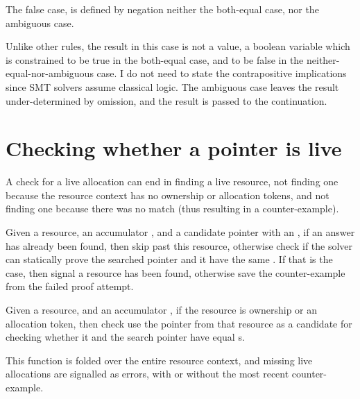 The false case, is defined by negation \textemdash{} neither the both-equal
case, nor the ambiguous case.


Unlike other rules, the result in this case is not a value, a boolean variable
which is constrained to be true in the both-equal case, and to be false in the
neither-equal-nor-ambiguous case. I do not need to state the contrapositive
implications since SMT solvers assume classical logic. The ambiguous case
leaves the result under-determined by omission, and the result is passed to the
continuation.


\section{Checking whether a pointer is live}

A check for a live allocation can end in finding a live resource, not finding
one because the resource context has no ownership or allocation tokens, and not
finding one because there was no match (thus resulting in a counter-example).


Given a resource, an accumulator , and a candidate pointer
with an  , if an answer has already been
found, then skip past this resource, otherwise check if the solver can
statically prove the searched pointer  and it have the same
\@. If that is the case, then signal a resource has been found,
otherwise save the counter-example from the failed proof attempt.


Given a resource, and an accumulator , if the resource is
ownership or an allocation token, then check use the pointer from that resource
as a candidate for checking whether it and the search pointer have equal
s.


This function is folded over the entire resource context, and missing live
allocations are signalled as errors, with or without the most recent
counter-example.


